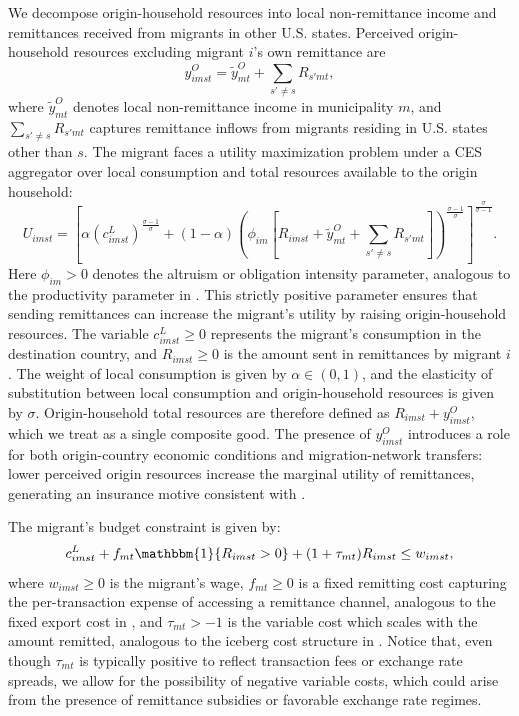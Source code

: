 We decompose origin-household resources into local non-remittance income and remittances received from migrants in other U.S. states. Perceived origin-household resources excluding migrant $i$'s own remittance are
\begin{equation}
    y^O_{imst}
    =
    \tilde{y}^O_{mt}
    +
    \sum_{s' \neq s} R_{s'mt},
\end{equation}
where $\tilde{y}^O_{mt}$ denotes local non-remittance income in municipality $m$, and $\sum_{s' \neq s} R_{s'mt}$ captures remittance inflows from migrants residing in U.S. states other than $s$. The migrant faces a utility maximization problem under a CES aggregator over local consumption and total resources available to the origin household:
\begin{equation}
    U_{imst}
    =
    \left[
    \alpha
    \left(c^L_{imst}\right)^{\frac{\sigma-1}{\sigma}}
    +
    (1-\alpha)
    \left(
    \phi_{im}
    \left[
    R_{imst}
    +
    \tilde{y}^O_{mt}
    +
    \sum_{s' \neq s} R_{s'mt}
    \right]
    \right)^{\frac{\sigma-1}{\sigma}}
    \right]^{\frac{\sigma}{\sigma-1}}.
\end{equation}
Here $\phi_{im} > 0$ denotes the altruism or obligation intensity parameter, analogous to the productivity parameter in \textcite{melitz2003}. This strictly positive parameter ensures that sending remittances can increase the migrant's utility by raising origin-household resources. The variable $c^L_{imst} \geq 0$ represents the migrant's consumption in the destination country, and $R_{imst} \geq 0$ is the amount sent in remittances by migrant $i$. The weight of local consumption is given by $\alpha \in (0,1)$, and the elasticity of substitution between local consumption and origin-household resources is given by $\sigma$. Origin-household total resources are therefore defined as $R_{imst} + y^O_{imst}$, which we treat as a single composite good. The presence of $y^O_{imst}$ introduces a role for both origin-country economic conditions and migration-network transfers: lower perceived origin resources increase the marginal utility of remittances, generating an insurance motive consistent with \textcite{yang_choi_2007}. 

\par 

The migrant's budget constraint is given by:
\begin{equation}
    c^L_{imst}
    +
    f_{mt}\mathbbm{1}\{R_{imst} > 0\}
    +
    (1 + \tau_{mt})R_{imst}
    \leq
    w_{imst},
\end{equation}
where $w_{imst} \geq 0$ is the migrant's wage, $f_{mt} \geq 0$ is a fixed remitting cost capturing the per-transaction expense of accessing a remittance channel, analogous to the fixed export cost in \textcite{melitz2003}, and $\tau_{mt} > -1$ is the variable cost which scales with the amount remitted, analogous to the iceberg cost structure in \textcite{melitz2003}. Notice that, even though $\tau_{mt}$ is typically positive to reflect transaction fees or exchange rate spreads, we allow for the possibility of negative variable costs, which could arise from the presence of remittance subsidies or favorable exchange rate regimes.

